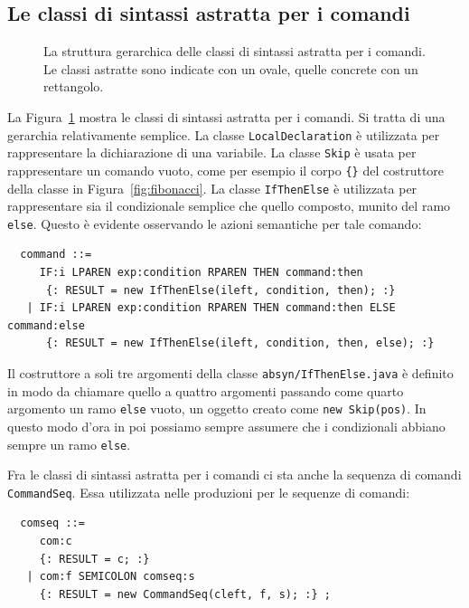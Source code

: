 \subsection{Le classi di sintassi astratta per i comandi}
  \label{subsec:commands_abstract}
%
\begin{figure}[t]
\begin{center}
\end{center}
\caption{La struttura gerarchica delle classi di sintassi astratta per
         i comandi. Le classi astratte sono indicate con un
         ovale, quelle concrete con un rettangolo.}
  \label{fig:commands_hierarchy}
\end{figure}
%
La Figura~\ref{fig:commands_hierarchy} mostra le classi di sintassi astratta
per i comandi. Si tratta di una gerarchia relativamente semplice.
La classe \texttt{LocalDeclaration} \`e
utilizzata per rappresentare la dichiarazione di una variabile.
La classe \texttt{Skip} \`e usata per rappresentare un comando vuoto,
come per esempio il corpo \verb!{}! del costruttore della classe in
Figura~\ref{fig:fibonacci}.
La classe \texttt{IfThenElse} \`e utilizzata per rappresentare sia il
condizionale semplice che quello composto, \cioe munito del ramo \texttt{else}.
Questo \`e evidente osservando le azioni semantiche per tale comando:
%
\begin{verbatim}
  command ::=
     IF:i LPAREN exp:condition RPAREN THEN command:then
      {: RESULT = new IfThenElse(ileft, condition, then); :}
   | IF:i LPAREN exp:condition RPAREN THEN command:then ELSE command:else
      {: RESULT = new IfThenElse(ileft, condition, then, else); :}
\end{verbatim}
%
Il costruttore a soli tre argomenti della classe
\texttt{absyn/IfThenElse.java} \`e definito in modo da chiamare
quello a quattro argomenti passando come quarto argomento un ramo
\texttt{else} vuoto, \cioe un oggetto creato come
\texttt{new Skip(pos)}. In questo modo d'ora in poi possiamo sempre
assumere che i condizionali abbiano sempre un ramo \texttt{else}.

Fra le classi di sintassi astratta per i comandi ci sta anche la sequenza
di comandi \texttt{CommandSeq}. Essa \e utilizzata nelle produzioni per le
sequenze di comandi:
%
\begin{verbatim}
  comseq ::=
     com:c
     {: RESULT = c; :}
   | com:f SEMICOLON comseq:s
     {: RESULT = new CommandSeq(cleft, f, s); :} ;
\end{verbatim}

